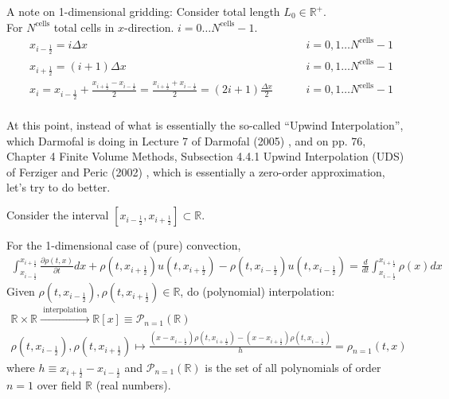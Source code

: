 \documentclass[10pt]{amsart}
\begin{document}
\begin{multicols*}{2}
A note on 1-dimensional gridding: Consider total length $L_0 \in \mathbb{R}^+$.  \\
For $N^{\text{cells}}$ total cells in $x$-direction.  $i=0\dots N^{\text{cells}}-1$.
\[
\begin{aligned}
  & x_{i-\frac{1}{2}} = i \Delta x \qquad \, & i = 0, 1 \dots N^{\text{cells}} - 1 \\ 
  & x_{i+\frac{1}{2}} = (i+1) \Delta x \qquad \, & i = 0, 1 \dots N^{\text{cells}} - 1 \\ 
  & x_i = x_{i-\frac{1}{2} } + \frac{ x_{i+\frac{1}{2}} - x_{i-\frac{1}{2} } }{2} = \frac{ x_{i + \frac{1}{2} } + x_{i-\frac{1}{2} } }{2} = (2 i + 1)\frac{  \Delta x }{2} \qquad \, & i = 0, 1 \dots N^{\text{cells}} - 1 \\ 
\end{aligned}
\]



At this point, instead of what is essentially the so-called ``Upwind Interpolation'', which Darmofal is doing in Lecture 7 of Darmofal (2005) \cite{Darm2005}, and on pp. 76, Chapter 4 Finite Volume Methods, Subsection 4.4.1 Upwind Interpolation (UDS) of Ferziger and Peric (2002) \cite{FP2013}, which is essentially a zero-order approximation, let's try to do better.  

Consider the interval $[x_{i-\frac{1}{2}}, x_{i+\frac{1}{2} } ] \subset \mathbb{R}$.

For the 1-dimensional case of (pure) convection,
\[
\begin{gathered}
  \int_{x_{i - \frac{1}{2}}}^{x_{i+\frac{1}{2} } } \frac{ \partial \rho (t,x) }{ \partial t } dx + \rho(t,x_{ i +\frac{1}{2} } ) u(t,x_{i +\frac{1}{2} } ) - \rho(t, x_{i -\frac{1}{2} } )u(t,x_{i -\frac{1}{2}} ) = \frac{d}{dt} \int_{x_{i -\frac{1}{2} } }^{ x_{i +\frac{1}{2} } } \rho(x) dx
  \end{gathered}
\]
Given $\rho(t,x_{i -\frac{1}{2} }), \rho(t, x_{i +\frac{1}{2} }) \in \mathbb{R}$, do (polynomial) interpolation:
\[
\begin{gathered}
  \mathbb{R} \times \mathbb{R} \xrightarrow{ \text{ interpolation }} \mathbb{R}[x] \equiv \mathcal{P}_{n=1}(\mathbb{R}) \\ 
 \rho(t,x_{i -\frac{1}{2} }), \rho(t, x_{i +\frac{1}{2} }) \mapsto \frac{ (x - x_{ i -\frac{1}{2}}) \rho(t, x_{i +\frac{1}{2}}) - (x - x_{i +\frac{1}{2}} )\rho(t,x_{i -\frac{1}{2}}) }{ h } = \rho_{n=1}(t,x)
\end{gathered}
\]
where $h \equiv x_{i +\frac{1}{2}} - x_{i -\frac{1}{2}}$ and $\mathcal{P}_{n=1}(\mathbb{R})$ is the set of all polynomials of order $n=1$ over field $\mathbb{R}$ (real numbers).


\end{multicols*}
\end{document}
